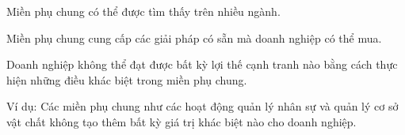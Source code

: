 Miền phụ chung   có thể được tìm thấy trên nhiều ngành.

Miền phụ chung cung cấp các giải pháp có sẵn mà doanh nghiệp có thể mua.

Doanh nghiệp không thể đạt được bất kỳ lợi thế cạnh tranh nào bằng cách thực hiện những điều khác biệt trong miền phụ chung.

Ví dụ: Các miền phụ chung như các hoạt động quản lý nhân sự và quản lý cơ sở vật chất không tạo thêm bất kỳ giá trị khác biệt nào cho doanh nghiệp.  
  
 